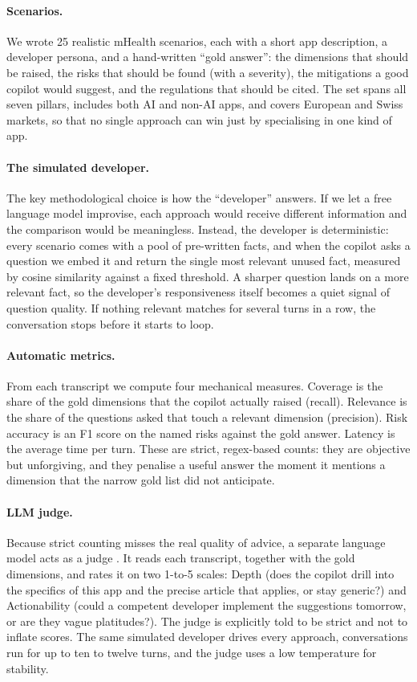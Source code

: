 \documentclass[11pt]{article}
\begin{document}
\paragraph{Scenarios.}
We wrote 25 realistic mHealth scenarios, each with a short app description, a
developer persona, and a hand-written ``gold answer'': the dimensions that should be
raised, the risks that should be found (with a severity), the mitigations a good copilot
would suggest, and the regulations that should be cited. The set spans all seven pillars,
includes both AI and non-AI apps, and covers European and Swiss markets, so that no single
approach can win just by specialising in one kind of app.
\paragraph{The simulated developer.}
The key methodological choice is how the ``developer'' answers. If we let a free language
model improvise, each approach would receive different information and the comparison
would be meaningless. Instead, the developer is deterministic: every scenario comes
with a pool of pre-written facts, and when the copilot asks a question we embed it and
return the single most relevant unused fact, measured by cosine similarity against a fixed
threshold. A sharper question lands on a more relevant fact, so the developer's
responsiveness itself becomes a quiet signal of question quality. If nothing relevant
matches for several turns in a row, the conversation stops before it starts to loop.
\paragraph{Automatic metrics.}
From each transcript we compute four mechanical measures. Coverage is the share of
the gold dimensions that the copilot actually raised (recall). Relevance is the
share of the questions asked that touch a relevant dimension (precision). Risk
accuracy is an F1 score on the named risks against the gold answer. Latency is the
average time per turn. These are strict, regex-based counts: they are objective but
unforgiving, and they penalise a useful answer the moment it mentions a dimension that the
narrow gold list did not anticipate.
\paragraph{LLM judge.}
Because strict counting misses the real quality of advice, a separate language model acts
as a judge \citep{zheng2023judging}. It reads each transcript, together with the gold
dimensions, and rates it on two 1-to-5 scales: Depth (does the copilot drill
into the specifics of this app and the precise article that applies, or stay
generic?) and Actionability (could a competent developer implement the suggestions
tomorrow, or are they vague platitudes?). The judge is explicitly told to be strict and
not to inflate scores. The same simulated developer drives every approach, conversations
run for up to ten to twelve turns, and the judge uses a low temperature for stability.
\end{document}
